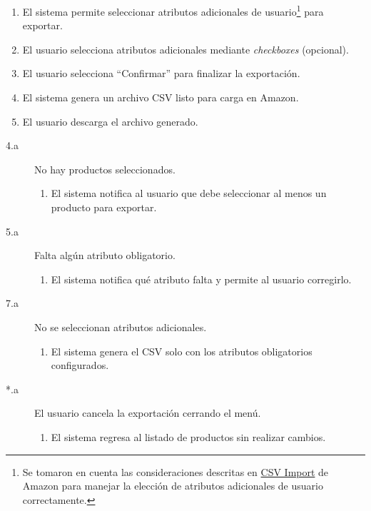 \begin{enumerate}
    \item El sistema permite seleccionar atributos adicionales de usuario\footnote{Se tomaron en cuenta las consideraciones descritas en \href{https://buywithprime.amazon.com/knowledge-center/csv-import?utm_medium=website\&utm_source=direct\#standalone-product}{CSV Import} de Amazon para manejar la elección de atributos adicionales de usuario correctamente.} para exportar.
    \item El usuario selecciona atributos adicionales mediante \textit{checkboxes} (opcional).
    \item El usuario selecciona \enquote{Confirmar} para finalizar la exportación.
    \item El sistema genera un archivo CSV listo para carga en Amazon.
    \item El usuario descarga el archivo generado.
\end{enumerate}

\begin{description}
    \item[4.a] No hay productos seleccionados.
    \begin{enumerate}
        \item[4.a.1] El sistema notifica al usuario que debe seleccionar al menos un producto para exportar.
    \end{enumerate}
    \item[5.a] Falta algún atributo obligatorio.
    \begin{enumerate}
        \item[5.a.1] El sistema notifica qué atributo falta y permite al usuario corregirlo.
    \end{enumerate}
    \item[7.a] No se seleccionan atributos adicionales.
    \begin{enumerate}
        \item[7.a.1] El sistema genera el CSV solo con los atributos obligatorios configurados.
    \end{enumerate}
    \item[*.a] El usuario cancela la exportación cerrando el menú.
    \begin{enumerate}
        \item[*.a.1] El sistema regresa al listado de productos sin realizar cambios.
    \end{enumerate}
\end{description}


